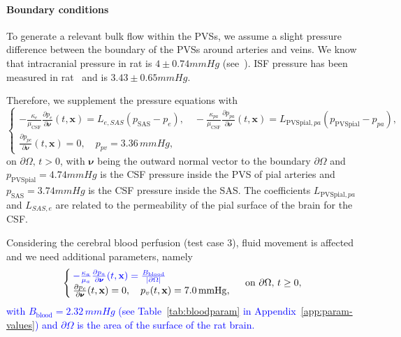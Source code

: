 \documentclass[10pt]{article}
\newcommand{\ie}{\emph{i.e.}\;}
\newcommand{\1}{^{(1)}}
\newcommand{\2}{^{(2)}}
\newcommand{\abs}[1]{\left\lvert#1\right\rvert}
\newcommand{\corr}[1]{\textcolor{blue}{#1}}
\begin{document}
\paragraph{Boundary conditions}
To generate a relevant bulk flow within the PVSs, we assume a slight pressure difference between the boundary of the PVSs around arteries and veins.
We know that intracranial pressure in rat is $4 \pm 0.74 \si{mmHg}$ (see~\cite{Roy-rat-pressure-2013}). 
ISF pressure has been measured in rat~\cite{Wiig-1983-interstitial} and is $3.43 \pm 0.65  \si{mmHg}$.


Therefore, we supplement the pressure equations with
\begin{equation}
\begin{cases}
    - \frac{\kappa_e}{\mu_\text{CSF}}\frac{\partial p_e}{\partial \pmb{\nu}}(t,\mathbf{x}) = L_{e , SAS}(p_\text{SAS}-p_{e}),\quad -\frac{\kappa_{pa}}{\mu_\text{CSF}}\frac{\partial p_{pa}}{\partial \pmb{ \nu}}(t,\mathbf x)  = L_{\text{PVSpial},pa}(p_{\text{PVSpial}}-p_{pa}), \\
    \frac{\partial p_{pc}}{\partial \pmb{\nu}}(t,\mathbf x) = 0, \quad p_{pv} = 3.36\, \si{mmHg},  %
\end{cases}
\label{eq:BC-4compsPVS}
\end{equation}
$\text{on } \partial \Omega,\, t>0$, with $\pmb{\nu}$ being the outward normal vector to the boundary $\partial \Omega$ and $p_\text{PVSpial} = 4.74\si{mmHg} $ is the CSF pressure inside the PVS of pial arteries and $p_\text{SAS} = 3.74 \si{mmHg} $ is the CSF pressure inside the SAS. The coefficients $L_{\text{PVSpial},pa}$ and $L_{SAS , e}$ are related to the permeability of the pial surface of the brain for the CSF.

Considering the cerebral blood perfusion (test case 3), fluid movement is affected and we need additional parameters, namely
\begin{equation}
\begin{cases}
   \corr{ -\frac{\kappa_{a}}{\mu_{a}}\frac{\partial p_{a}}{\partial \pmb{\nu}}(t,\mathbf x)  = \frac{B_\text{blood}}{\abs{\partial \Omega}}} \\
    \frac{\partial p_{c}}{\partial \pmb{\nu}}(t,\mathbf x) = 0, \quad p_{v}(t,\mathbf x) = 7.0\, \si{mmHg}, 
\end{cases}
\text{ on } \partial \Omega, \, t\ge 0,
    \label{eq:BC-4compsblood}
\end{equation}
\corr{with $B_\text{blood} = 2.32 \, \si{mmHg}$ (see Table~\ref{tab:bloodparam} in Appendix~\ref{app:param-values}) and $\partial \Omega$ is the area of the surface of the rat brain.}
\end{document}
